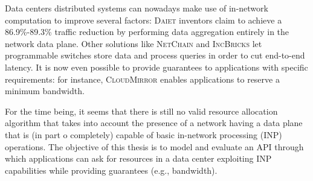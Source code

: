 Data centers distributed systems can nowadays make use of in-network computation to improve several factors: \textsc{Daiet} \cite{daiet} inventors claim to achieve a 86.9\%-89.3\% traffic reduction by performing data aggregation entirely in the network data plane.
Other solutions like \textsc{NetChain} \cite{netchain} and \textsc{IncBricks} \cite{incbricks} let programmable switches store data and process queries in order to cut end-to-end latency.
It is now even possible to provide guarantees to applications with specific requirements: for instance, \textsc{CloudMirror} \cite{cloudmirror} enables applications to reserve a minimum bandwidth.\par
For the time being, it seems that there is still no valid resource allocation algorithm that takes into account the presence of a network having a data plane that is (in part o completely) capable of basic in-network processing (INP) operations.
The objective of this thesis is to model and evaluate an API through which applications can ask for resources in a data center exploiting INP capabilities while providing guarantees (e.g., bandwidth).